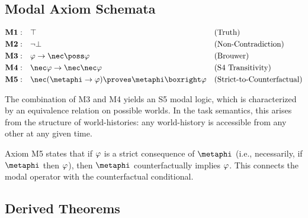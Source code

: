 \documentclass[../LogosReference.tex]{subfiles}
\begin{document}

\subsection{Modal Axiom Schemata}\label{sec:modal-axioms}

\begin{definition}\label{def:modal-axioms}
	\begin{align}
		\textbf{M1}: \quad & \top                                                        &  & \text{(Truth)}                    \\
		\textbf{M2}: \quad & \neg\bot                                                    &  & \text{(Non-Contradiction)}        \\
		\textbf{M3}: \quad & \metaA \to \nec\poss\metaA                                  &  & \text{(Brouwer)}                  \\
		\textbf{M4}: \quad & \nec\metaA \to \nec\nec\metaA                               &  & \text{(S4 Transitivity)}          \\
		\textbf{M5}: \quad & \nec(\metaphi \to \metaA) \proves \metaphi \boxright \metaA &  & \text{(Strict-to-Counterfactual)}
	\end{align}
\end{definition}

\begin{remark}
	The combination of M3 and M4 yields an S5 modal logic, which is characterized by an equivalence relation on possible worlds.
	In the task semantics, this arises from the structure of world-histories: any world-history is accessible from any other at any given time.
\end{remark}

\begin{remark}
	Axiom M5 states that if $\varphi$ is a strict consequence of $\metaphi$ (i.e., necessarily, if $\metaphi$ then $\varphi$), then $\metaphi$ counterfactually implies $\varphi$.
	This connects the modal operator with the counterfactual conditional.
\end{remark}


\subsection{Derived Theorems}\label{sec:derived-theorems}
\end{document}
